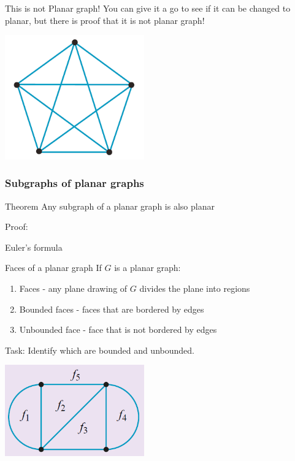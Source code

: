 \documentclass[
	11pt, %
]{beamer}
\begin{document}
\begin{frame}{This is not Planar graph!}
    You can give it a go to see if it can be changed to planar, but there is proof that it is not planar graph!\\
    \begin{center}
        \includegraphics[width = 6cm]{N_planar.png}\\
    \end{center}
\end{frame}

\begin{frame}[t]
    \frametitle{Subgraphs of planar graphs}
    \begin{block}{Theorem}
        Any subgraph of a planar graph is also planar
    \end{block}
    Proof:
\end{frame}

\begin{frame}{Euler's formula}
    \begin{block}{Faces of a planar graph}
        If $G$ is a planar graph:
        \begin{enumerate}
            \item Faces - any plane drawing of $G$ divides the plane into regions
            \item Bounded faces - faces that are bordered by edges
            \item Unbounded face - face that is not bordered by edges
        \end{enumerate}
    \end{block}
    Task: Identify which are bounded and unbounded.
    \begin{center}
        \includegraphics[width = 6cm]{Bounded.png}\\
    \end{center}
\end{frame}
\end{document}
